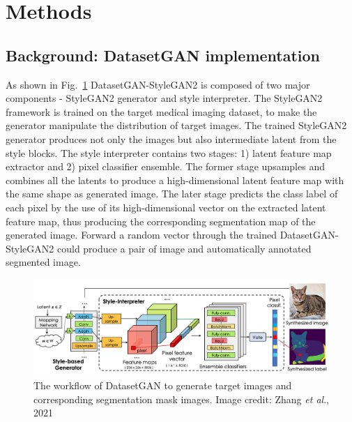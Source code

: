 \documentclass[conference]{IEEEtran}
\newcommand{\etal}{\textit{et al}.}
\begin{document}
\section{Methods}

\subsection{Background: DatasetGAN implementation}
As shown in Fig.~\ref{fig:workflow} DatasetGAN-StyleGAN2 is composed of two major components - StyleGAN2 generator and style interpreter. The StyleGAN2 framework is trained on the target medical imaging dataset, to make the generator manipulate the distribution of target images. The trained StyleGAN2 generator produces not only the images but also intermediate latent from the style blocks. 
The style interpreter contains two stages: 1) latent feature map extractor and 2) pixel classifier ensemble. The former stage upsamples and combines all the latents to produce a high-dimensional latent feature map with the same shape as generated image. The later stage predicts the class label of each pixel by the use of its high-dimensional vector on the extracted latent feature map, thus producing the corresponding segmentation map of the generated image. Forward a random vector through the trained DatasetGAN-StyleGAN2 could produce a pair of image and automatically annotated segmented image. 


\begin{figure}[!ht]
  \includegraphics[width=\textwidth]{./fig/datasetgan_framework.png} 
  \caption{The workflow of DatasetGAN to generate target images and corresponding segmentation mask images. Image credit: Zhang \etal, 2021\cite{Zhang2021DatasetGANEL}}
  \label{fig:workflow}
\end{figure}
\end{document}
